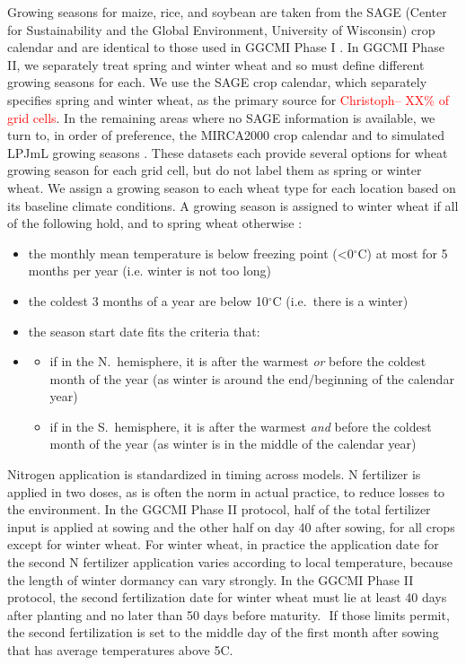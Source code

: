 \documentclass[gmd, manuscript]{copernicus} %
\begin{document}
Growing seasons for maize, rice, and soybean are taken from the SAGE (Center for Sustainability and the Global Environment, University of Wisconsin) crop calendar \citep{Sacks2010} and are identical to those used in GGCMI Phase I \citep{Elliott2015}.
In GGCMI Phase II, we separately treat spring and winter wheat and so must define different growing seasons for each.
We use the SAGE crop calendar, which separately specifies spring and winter wheat, as the primary source for \textcolor{red}{Christoph-- XX\% of grid cells}. 
In the remaining areas where no SAGE information is available, we turn to, in order of preference, the MIRCA2000 crop calendar \citep{Portmann2010} and to simulated LPJmL growing seasons \citep{waha2012climate}.  
These datasets each provide several options for wheat growing season for each grid cell, but do not label them as spring or winter wheat. We assign a growing season to each wheat type for each location based on its baseline climate conditions. 
A growing season is assigned to winter wheat if all of the following hold, and to spring wheat otherwise :

\begin{itemize}
  \item{the monthly mean temperature is below freezing point (<0$^\circ$C) at most for 5 months per year (i.e. winter is not too long)}
  \item{the coldest 3 months of a year are below 10$^\circ$C (i.e.\ there is a winter)}
  \item{the season start date fits the criteria that:}
  \item[]{\begin{itemize}  
      \item{if in the N.\ hemisphere, it is after the warmest \textit{or} before the coldest month of the year (as winter is around the end/beginning of the calendar year)}
      \item{if in the S.\ hemisphere, it is after the warmest \textit{and} before the coldest month of the year (as winter is in the middle of the calendar year)}
      \end{itemize}}
\end{itemize}

Nitrogen application is standardized in timing across models. 
N fertilizer is applied in two doses, as is often the norm in actual practice, to reduce losses to the environment. 
In the GGCMI Phase II protocol, half of the total fertilizer input is applied at sowing and the other half on day 40 after sowing, for all crops except for winter wheat. 
For winter wheat, in practice the application date for the second N fertilizer application varies according to local temperature, because the length of winter dormancy can vary strongly. 
In the GGCMI Phase II protocol, the second fertilization date for winter wheat must lie at least 40 days after planting and no later than 50 days before maturity. 
If those limits permit, the second fertilization is set to the middle day of the first month after sowing that has average temperatures above 5C.
\end{document}
